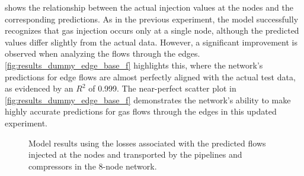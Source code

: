  shows the relationship between the actual injection values at the nodes and the corresponding predictions. As in the previous experiment, the model successfully recognizes that gas injection occurs only at a single node, although the predicted values differ slightly from the actual data. However, a significant improvement is observed when analyzing the flows through the edges. \cref{fig:results_dummy_edge_base_f} highlights this, where the network's predictions for edge flows are almost perfectly aligned with the actual test data, as evidenced by an $R^2$ of 0.999. The near-perfect scatter plot in \cref{fig:results_dummy_edge_base_f} demonstrates the network's ability to make highly accurate predictions for gas flows through the edges in this updated experiment.



\begin{figure}
    \centering
        \setlength{}        
        \setlength{} 
    \caption{Model results using the losses associated with the predicted flows injected at the nodes and transported by the pipelines and compressors in the 8-node network.}
    \label{fig:dummy_base_f_results}
\end{figure}


%
%
%


